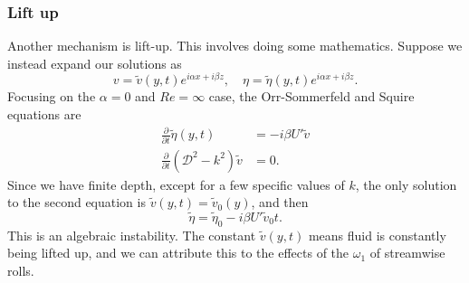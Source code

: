 \documentclass[a4paper]{article}
\begin{document}
\subsubsection*{Lift up}
Another mechanism is lift-up. This involves doing some mathematics. Suppose we instead expand our solutions as
\[
  v = \tilde{v}(y, t) e^{i\alpha x + i \beta z},\quad \eta = \tilde{\eta}(y, t) e^{i\alpha x + i \beta z}.
\]
Focusing on the $\alpha = 0$ and $Re = \infty$ case, the Orr-Sommerfeld and Squire equations are
\begin{align*}
  \frac{\partial}{\partial t} \tilde{\eta}(y, t) &= -i\beta U' \tilde{v}\\
  \frac{\partial}{\partial t} (\mathcal{D}^2 - k^2) \tilde{v} &= 0.
\end{align*}
Since we have finite depth, except for a few specific values of $k$, the only solution to the second equation is $\tilde{v}(y, t) = \tilde{v}_0(y)$, and then
\[
  \tilde{\eta} = \tilde{\eta}_0 - i \beta U' \tilde{v}_0 t.
\]
This is an algebraic instability. The constant $\tilde{v}(y, t)$ means fluid is constantly being lifted up, and we can attribute this to the effects of the $\omega_1$ of streamwise rolls.

\end{document}
